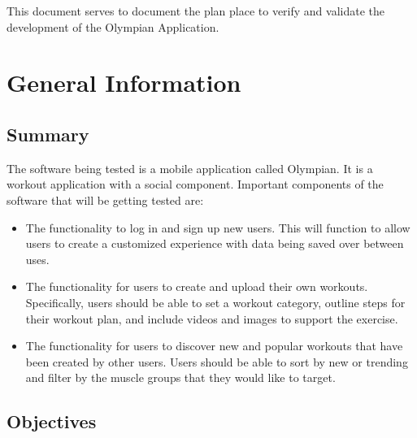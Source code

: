 \documentclass[12pt, titlepage]{article}
\begin{document}
	\newpage
	
	\tableofcontents
	
	\listoftables
	
	\newpage
	
	\newpage
	
	
	This document serves to document the plan place to verify and validate the development of the Olympian Application.
	
	\section{General Information}
	
	\subsection{Summary}
	
	
	The software being tested is a mobile application called Olympian. It is a workout application with a social component.
	Important components of the software that will be getting tested are:

	\begin{itemize}
		\item The functionality to log in and sign up new users. This will function to allow users to create a customized experience with data being saved over between uses.
		\item The functionality for users to create and upload their own workouts. Specifically, users should be able to set a workout category, outline steps for their workout plan, and include videos and images to support the exercise.
		\item The functionality for users to discover new and popular workouts that have been created by other users. Users should be able to sort by new or trending and filter by the muscle groups that they would like to target.
	\end{itemize}
	
	\subsection{Objectives}
	
\end{document}
